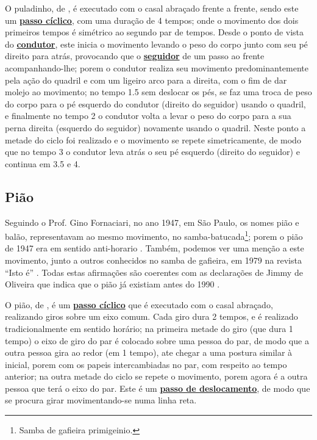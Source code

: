 O puladinho, de \AnoLivro, é executado com o casal abraçado frente a frente, sendo este um \hyperref[def:PassoCiclico]{\textbf{passo cíclico}},
com uma duração de 4 tempos; onde o movimento dos dois primeiros tempos
é simétrico ao segundo par de tempos.
Desde o ponto de vista do  \hyperref[def:Condutor]{\textbf{condutor}}, 
este inicia o movimento levando o peso do corpo junto com seu pé direito para atrás, provocando que
o \hyperref[def:Seguidor]{\textbf{seguidor}} de um passo ao frente acompanhando-lhe;
porem o condutor realiza seu movimento predominantemente pela ação do quadril e com um ligeiro arco para a direita, 
com o fim de dar molejo ao movimento;
no tempo 1.5 sem deslocar os pés, 
se faz uma troca de peso do corpo para o pé esquerdo do condutor (direito do seguidor) usando o quadril,
e finalmente no tempo 2 o condutor volta a levar o peso 
do corpo para a sua perna direita (esquerdo do seguidor) novamente usando o quadril.
Neste ponto a metade do ciclo foi realizado e o movimento se repete simetricamente, 
de modo que no tempo 3 o condutor leva atrás o seu pé esquerdo (direito do seguidor) e continua em 3.5 e 4.

 
\subsection{Pião}

Seguindo o Prof. Gino Fornaciari, no ano 1947,  em São Paulo, os nomes pião e balão,
representavam ao mesmo movimento, no samba-batucada\footnote{Samba de gafieira primigeinio.}; 
porem o pião de 1947 era em sentido anti-horario \cite[pp. 68-72]{fornaciari1947aprender}.
Também, podemos ver uma menção a este movimento, junto a outros conhecidos no samba de gafieira, 
em 1979 na revista ``Isto é'' \cite[pp. 89]{revista1979isto}.
Todas estas afirmações são coerentes com as declarações de Jimmy de Oliveira 
que indica que o pião já existiam antes do 1990 \cite{sambafunkeadoJimmyDeOliveiraPart1}.

O pião, de \AnoLivro, é um \hyperref[def:PassoCiclico]{\textbf{passo cíclico}} que é executado com o casal abraçado, 
realizando giros sobre um eixo comum.
Cada giro dura 2 tempos, e é realizado tradicionalmente em sentido horário;
na primeira metade do giro (que dura 1 tempo) o eixo de giro do par é colocado sobre uma pessoa do par, 
de modo que a outra pessoa gira ao redor (em 1 tempo), ate chegar a uma postura similar à inicial, 
porem com os papeis intercambiadas no par, com respeito ao tempo anterior;
na outra metade do ciclo se repete o movimento, porem agora é a outra pessoa que terá o eixo do par.
Este é um \hyperref[def:PassoDeDeslocamento]{\textbf{passo de deslocamento}}, 
de modo que se procura girar movimentando-se numa linha reta.

